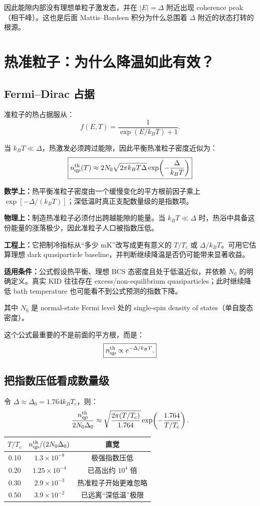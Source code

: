 \documentclass[11pt,a4paper,openany]{ctexrep}
\newcommand{\formulaexplain}[4]{%
\begin{formulaguidebox}
\textbf{\color{KidBlue}数学上：}#1\par
\textbf{\color{KidTeal}物理上：}#2\par
\textbf{\color{KidGold!55!black}工程上：}#3\par
\textbf{\color{KidRed}适用条件：}#4
\end{formulaguidebox}%
}
\newcommand{\qp}{\mathrm{qp}}
\begin{document}
因此能隙内部没有理想单粒子激发态，并在 $|E|=\Delta$ 附近出现 coherence peak（相干峰）。这也是后面 Mattis--Bardeen 积分为什么总围着 $\Delta$ 附近的状态打转的根源。

\section{热准粒子：为什么降温如此有效？}

\subsection{Fermi--Dirac 占据}
准粒子的热占据服从：
\[
f(E,T)=\frac{1}{\exp(E/k_BT)+1}.
\]

当 $k_BT\ll\Delta$，热激发必须跨过能隙，因此平衡热准粒子密度近似为：
\[
\boxed{
n_{\qp}^{\rm th}(T)
\approx
2N_0\sqrt{2\pi k_BT\Delta}
\exp\!\left(-\frac{\Delta}{k_BT}\right)
}
\]
\formulaexplain
{热平衡准粒子密度由一个缓慢变化的平方根前因子乘上 $\exp[-\Delta/(k_BT)]$；深低温时真正支配数量级的是指数项。}
{制造热准粒子必须付出跨越能隙的能量。当 $k_BT\ll\Delta$ 时，热浴中具备这份能量的涨落极少，因此准粒子人口被指数压低。}
{它把制冷指标从“多少 mK”改写成更有意义的 $T/T_c$ 或 $\Delta/k_BT$。可用它估算理想 dark quasiparticle baseline，并判断继续降温是否仍可能带来显著收益。}
{公式假设热平衡、理想 BCS 态密度且处于低温近似，并依赖 $N_0$ 的明确定义。真实 KID 往往存在 excess/non-equilibrium quasiparticles；此时继续降低 bath temperature 也可能看不到公式预测的指数下降。}

其中 $N_0$ 是 normal-state Fermi level 处的 single-spin density of states（单自旋态密度）。

这个公式最重要的不是前面的平方根，而是：
\[
\boxed{n_{\qp}^{\rm th}\propto e^{-\Delta/k_BT}.}
\]

\subsection{把指数压低看成数量级}
令 $\Delta\approx\Delta_0=1.764k_BT_c$，则：
\[
\frac{n_{\qp}^{\rm th}}{2N_0\Delta_0}
\approx
\sqrt{\frac{2\pi(T/T_c)}{1.764}}
\exp\!\left(-\frac{1.764}{T/T_c}\right).
\]

\begin{center}
\begin{tabular}{ccc}
\toprule
$T/T_c$ & $n_{\qp}^{\rm th}/(2N_0\Delta_0)$ & 直觉 \\
\midrule
0.10 & $1.3\times10^{-8}$ & 极强指数压低 \\
0.20 & $1.25\times10^{-4}$ & 已高出约 $10^4$ 倍 \\
0.30 & $2.9\times10^{-3}$ & 热准粒子开始更难忽略 \\
0.50 & $3.9\times10^{-2}$ & 已远离“深低温”极限 \\
\bottomrule
\end{tabular}
\end{center}
\end{document}
